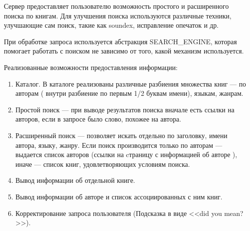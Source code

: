 Сервер предоставляет пользователю возможность простого и расширенного поиска по книгам. Для улучшения поиска используются различные техники, улучшающие сам поиск, такие как soundex, исправление опечаток и др. %

При обработке запроса используется абстракция SEARCH\_ENGINE, которая помогает работать с поиском не зависимо от того, какой механизм используется.

Реализованные возможности предоставления информации:
\begin{enumerate}
	\item Каталог. В каталоге реализованы различные разбиения множества книг --- по авторам ( внутри разбиение по первым 1/2 буквам имени), языкам, жанрам.
	\item Простой поиск --- при выводе результатов поиска вначале есть ссылки на авторов, если в запросе было слово, похожее на автора.
	\item Расширенный поиск --- позволяет искать отдельно по заголовку, имени автора, языку, жанру. Если поиск производится только по авторам --- выдается список авторов (ссылки на cтраницу с информацией об авторе ), иначе --- список книг, удовлетворяющих условиям поиска.
\item Вывод информации об отдельной книге.
\item Вывод информации об авторе и список ассоциированных с ним книг.
\item Корректирование запроса пользователя (Подсказка в виде <<did you mean?>>).
\end{enumerate}


\newpage